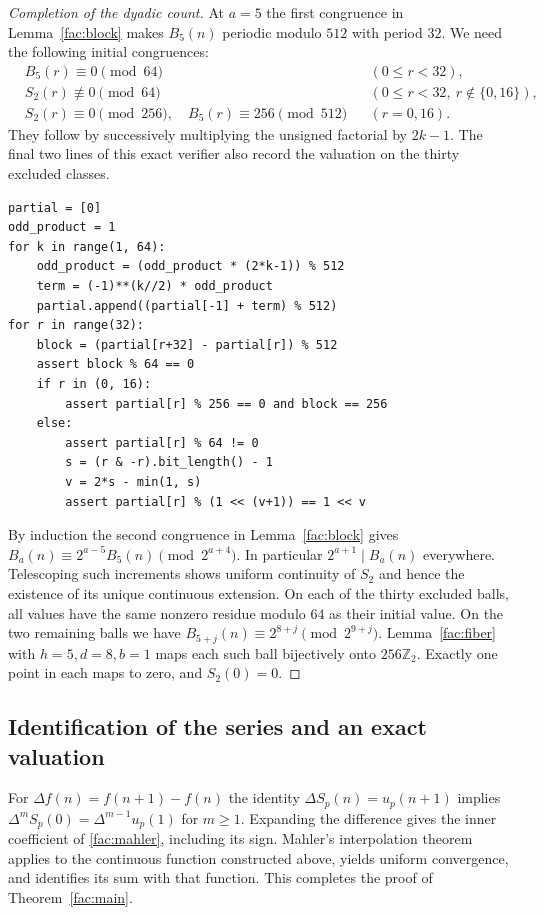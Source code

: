 \documentclass[11pt]{article}
\theoremstyle{remark}\newtheorem{remark}[theorem]{Remark}
\begin{document}
\begin{proof}[Completion of the dyadic count]
At $a=5$ the first congruence in Lemma~\ref{fac:block} makes
$B_5(n)$ periodic modulo $512$ with period $32$.
We need the following initial congruences:
\begin{align*}
 &B_5(r)\equiv0\pmod{64} &&(0\le r<32),\\
 &S_2(r)\not\equiv0\pmod{64} &&(0\le r<32,\ r\notin\{0,16\}),\\
 &S_2(r)\equiv0\pmod{256},\quad B_5(r)\equiv256\pmod{512}
       &&(r=0,16).
\end{align*}
They follow by successively multiplying the unsigned factorial by
$2k-1$. The final two lines of this exact verifier also record the
valuation on the thirty excluded classes.

\begin{verbatim}
partial = [0]
odd_product = 1
for k in range(1, 64):
    odd_product = (odd_product * (2*k-1)) % 512
    term = (-1)**(k//2) * odd_product
    partial.append((partial[-1] + term) % 512)
for r in range(32):
    block = (partial[r+32] - partial[r]) % 512
    assert block % 64 == 0
    if r in (0, 16):
        assert partial[r] % 256 == 0 and block == 256
    else:
        assert partial[r] % 64 != 0
        s = (r & -r).bit_length() - 1
        v = 2*s - min(1, s)
        assert partial[r] % (1 << (v+1)) == 1 << v
\end{verbatim}

By induction the second congruence in Lemma~\ref{fac:block} gives
$B_a(n)\equiv2^{a-5}B_5(n)\pmod{2^{a+4}}$. In particular
$2^{a+1}\mid B_a(n)$ everywhere. Telescoping such increments shows
uniform continuity of $S_2$ and hence the existence of its unique
continuous extension. On each of the thirty excluded balls, all
values have the same nonzero residue modulo $64$ as their initial
value. On the two remaining balls we have
$B_{5+j}(n)\equiv2^{8+j}\pmod{2^{9+j}}$.
Lemma~\ref{fac:fiber} with $h=5,d=8,b=1$ maps each such ball
bijectively onto $256\mathbb Z_2$. Exactly one point in each maps
to zero, and $S_2(0)=0$.
\end{proof}

\subsection{Identification of the series and an exact valuation}
For $\Delta f(n)=f(n+1)-f(n)$ the identity $\Delta S_p(n)=u_p(n+1)$
implies $\Delta^m S_p(0)=\Delta^{m-1}u_p(1)$ for $m\ge1$.
Expanding the difference gives the inner coefficient of
\eqref{fac:mahler}, including its sign. Mahler's interpolation theorem \cite{Mahler} applies to the continuous function constructed above, yields
uniform convergence, and identifies its sum with that function.
This completes the proof of Theorem~\ref{fac:main}.
\end{document}
